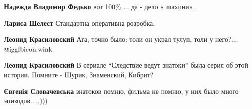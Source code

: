 \begin{itemize}
\begin{itemize}
\begin{itemize}
\textbf{Надежда Владимир Федько} вот 100\% ... да - дело « шахини»...

\textbf{Лариса Шелест} Стандартна оперативна розробка.

\textbf{Леонид Красиловский} Ага, точно было: толи он украл тулуп, толи у него?... @igg{fbicon.wink} 

\textbf{Леонид Красиловский} В сериале \enquote{Следствие ведут знатоки} была серия об этой истории. Помните - Шурик, Знаменский, Кибрит?

\textbf{Євгенія Словачевська} знатоков помню, фильма не помню, у них было много эпизодов....,)))
\end{itemize} %

\end{itemize} %


\end{itemize} %
